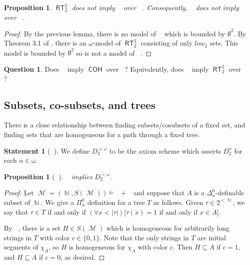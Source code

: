 \documentclass{amsart}
\theoremstyle{plain}
\newtheorem{proposition}[theorem]{Proposition}
\theoremstyle{remark}
\theoremstyle{definition}
\newtheorem{question}[theorem]{Question}
\newtheorem{statement}[theorem]{Statement}
\DeclareMathOperator{\RCA}{\mathsf{RCA}_0}
\DeclareMathOperator{\RT}{\mathsf{RT}}
\DeclareMathOperator{\COH}{\mathsf{COH}}
\DeclareMathOperator{\RKLp}{\mathsf{RKL}^{(1)}}
\DeclareMathOperator{\RKLa}{\mathsf{RKL}^{(<\omega)}}
\DeclareMathOperator{\N}{\mathbb{N}}
\DeclareMathOperator{\M}{\mathcal{M}}
\begin{document}
\begin{proposition} 
$\RT^2_2$ does not imply $\RKLa$ over $\RCA$.  
Consequently, $\RKLp$ does not imply $\RKLa$ over $\RCA$.
\end{proposition}
\begin{proof}
By the previous lemma, there is no model of $\RKLa$ which is bounded by $\emptyset^2$.  
By Theorem 3.1 of \cite{CJS}, there is an $\omega$-model of $\RT^2_2$ consisting of only $low_2$ sets.  
This model is bounded by $\emptyset^2$ so is not a model of $\RKLa$.  
\end{proof}


\begin{question}
Does $\RKLa$ imply $\COH$ over $\RCA$?    
Equivalently, does $\RKLa$ imply $\RT^2_2$ over $\RCA$?  
\end{question}

\subsection{Subsets, co-subsets, and trees}

There is a close relationship between finding subsets/cosubsets of a fixed set, 
	and finding sets that are homogeneous for a path through a fixed tree. 


\begin{statement}[$\RCA$]
We define $D^{<\omega}_2$ to be the axiom scheme which asserts $D^n_2$ for each $n\in\omega$.
\end{statement}


\begin{proposition}[$\RCA$]
\label{prop.RKLa-implies-Domega}
$\RKLa$ implies $D^{<\omega}_2$.
\end{proposition}

\begin{proof}
	Let $\M=(\N,S(\M))\models\RCA+\RKLa$ and suppose that $A$ is a $\Delta^0_n$-definable subset of $\N$.  
We give a $\Pi^0_n$ definition for a tree $T$ as follows.  Given $\tau\in 2^{<\N}$, we say that $\tau\in T$ if and only if $(\forall x<|\tau|)[\tau(x)=1$ if and only if $x\in A]$.
	
	By $\RKLa$, there is a set $H\in S(\M)$ which is homogeneous for arbitrarily long strings in $T$ with color $c\in\{0,1\}$.  Note that the only strings in $T$ are initial segments of $\chi_A$, so $H$ is homogeneous for $\chi_A$ with color $c$.  Then $H\subseteq A$ if $c=1$, and $H\subseteq\overline{A}$ if $c=0$, as desired. 
\end{proof}
\end{document}
